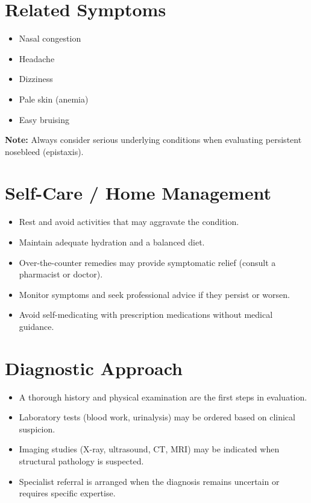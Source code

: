 \section*{Related Symptoms}
\begin{itemize}
  \item Nasal congestion
  \item Headache
  \item Dizziness
  \item Pale skin (anemia)
  \item Easy bruising
\end{itemize}
\textbf{Note:} Always consider serious underlying conditions when evaluating persistent nosebleed (epistaxis).

\section*{Self-Care / Home Management}
\begin{itemize}
  \item Rest and avoid activities that may aggravate the condition.
  \item Maintain adequate hydration and a balanced diet.
  \item Over-the-counter remedies may provide symptomatic relief (consult a pharmacist or doctor).
  \item Monitor symptoms and seek professional advice if they persist or worsen.
  \item Avoid self-medicating with prescription medications without medical guidance.
\end{itemize}

\section*{Diagnostic Approach}
\begin{itemize}
  \item A thorough history and physical examination are the first steps in evaluation.
  \item Laboratory tests (blood work, urinalysis) may be ordered based on clinical suspicion.
  \item Imaging studies (X-ray, ultrasound, CT, MRI) may be indicated when structural pathology is suspected.
  \item Specialist referral is arranged when the diagnosis remains uncertain or requires specific expertise.
\end{itemize}

